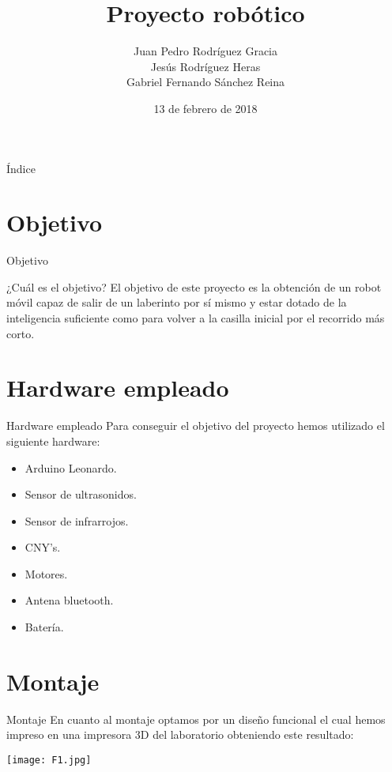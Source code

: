\documentclass{beamer}
\title{Proyecto robótico}
\author{Juan Pedro Rodríguez Gracia \\ Jesús Rodríguez Heras \\ Gabriel Fernando Sánchez Reina}
\date{13 de febrero de 2018}
\begin{document}
\begin{frame}
  \titlepage
  
  
\end{frame}

\begin{frame}{Índice}
  \tableofcontents
\end{frame}

\section{Objetivo}
\begin{frame}{Objetivo}
	\begin{block}{¿Cuál es el objetivo?}
		El objetivo de este proyecto es la obtención de un robot móvil capaz de salir de un laberinto por sí mismo y estar dotado de la inteligencia suficiente como para volver a la casilla inicial por el recorrido más corto.
	\end{block}
\end{frame}

\section{Hardware empleado}
\begin{frame}{Hardware empleado}
	Para conseguir el objetivo del proyecto hemos utilizado el siguiente hardware:
	\begin{itemize}
		\item Arduino Leonardo.
		\item Sensor de ultrasonidos.
		\item Sensor de infrarrojos.
		\item CNY's.
		\item Motores.
		\item Antena bluetooth.
		\item Batería.
	\end{itemize}
\end{frame}

\section{Montaje}
\begin{frame}{Montaje}
	En cuanto al montaje optamos por un diseño funcional el cual hemos impreso en una impresora 3D del laboratorio obteniendo este resultado:\\
	\begin{center}
		\texttt{[image: F1.jpg]}
	\end{center}	
\end{frame}
\end{document}
